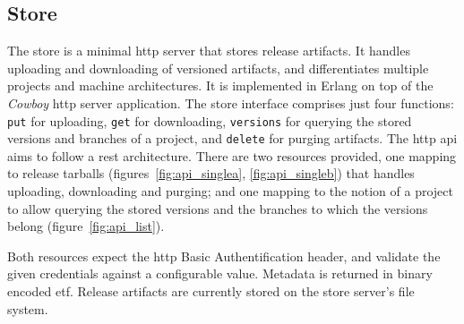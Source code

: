 {\cleardoublepage
\subsection{Store}

The store is a minimal \acrshort{http} server that stores release artifacts. It handles uploading and downloading of versioned artifacts, and differentiates multiple projects and machine architectures. It is implemented in Erlang on top of the \emph{Cowboy} \acrshort{http} server application. The store interface comprises just four functions: \lstinline|put| for uploading, \lstinline|get| for downloading, \lstinline|versions| for querying the stored versions and branches of a project, and \lstinline|delete| for purging artifacts. The \acrshort{http} \acrshort{api} aims to follow a \acrfull{rest} architecture. There are two resources provided, one mapping to release tarballs (figures~\ref{fig:api_singlea}, \ref{fig:api_singleb}) that handles uploading, downloading and purging; and one mapping to the notion of a project to allow querying the stored versions and the branches to which the versions belong (figure~\ref{fig:api_list}).

Both resources expect the \acrshort{http} Basic Authentification header, and validate the given credentials against a configurable value. Metadata is returned in binary encoded \acrfull{etf}. Release artifacts are currently stored on the store server's file system.

}
